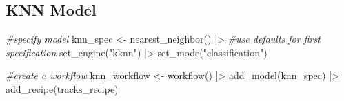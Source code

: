 \documentclass[
]{article}
\newenvironment{Shaded}{\begin{snugshade}}{\end{snugshade}}
\newcommand{\CommentTok}[1]{\textcolor[rgb]{0.56,0.35,0.01}{\textit{#1}}}
\newcommand{\FunctionTok}[1]{\textcolor[rgb]{0.00,0.00,0.00}{#1}}
\newcommand{\NormalTok}[1]{#1}
\newcommand{\OtherTok}[1]{\textcolor[rgb]{0.56,0.35,0.01}{#1}}
\newcommand{\SpecialCharTok}[1]{\textcolor[rgb]{0.00,0.00,0.00}{#1}}
\newcommand{\StringTok}[1]{\textcolor[rgb]{0.31,0.60,0.02}{#1}}
\begin{document}
\hypertarget{knn-model}{%
\subsection{KNN Model}\label{knn-model}}

\begin{Shaded}
\begin{Highlighting}[]
\CommentTok{\#specify model}
\NormalTok{knn\_spec }\OtherTok{\textless{}{-}} \FunctionTok{nearest\_neighbor}\NormalTok{() }\SpecialCharTok{|\textgreater{}} \CommentTok{\#use defaults for first specification}
  \FunctionTok{set\_engine}\NormalTok{(}\StringTok{"kknn"}\NormalTok{) }\SpecialCharTok{|\textgreater{}} 
  \FunctionTok{set\_mode}\NormalTok{(}\StringTok{"classification"}\NormalTok{) }

\CommentTok{\#create a workflow}
\NormalTok{knn\_workflow }\OtherTok{\textless{}{-}} \FunctionTok{workflow}\NormalTok{() }\SpecialCharTok{|\textgreater{}} 
  \FunctionTok{add\_model}\NormalTok{(knn\_spec) }\SpecialCharTok{|\textgreater{}} 
  \FunctionTok{add\_recipe}\NormalTok{(tracks\_recipe)}
\end{Highlighting}
\end{Shaded}
\end{document}
